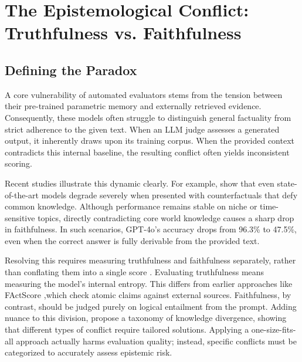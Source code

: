 \section{The Epistemological Conflict: Truthfulness vs. Faithfulness}
\label{sec:conflict}


\subsection{Defining the Paradox}

A core vulnerability of automated evaluators stems from the tension between their pre-trained parametric memory and externally retrieved evidence. Consequently, these models often struggle to distinguish general factuality from strict adherence to the given text. When an LLM judge assesses a generated output, it inherently draws upon its training corpus. When the provided context contradicts this internal baseline, the resulting conflict often yields inconsistent scoring.

Recent studies illustrate this dynamic clearly. For example, \citet{ming2025faithevallanguagemodelstay} show that even state-of-the-art models degrade severely when presented with counterfactuals that defy common knowledge. Although performance remains stable on niche or time-sensitive topics, directly contradicting core world knowledge causes a sharp drop in faithfulness. In such scenarios, GPT-4o's accuracy drops from 96.3\% to 47.5\%, even when the correct answer is fully derivable from the provided text.

Resolving this requires measuring truthfulness and faithfulness separately, rather than conflating them into a single score \citep{fadeeva2026faithfulnessawareuncertaintyquantificationfactchecking}. Evaluating truthfulness means measuring the model's internal entropy. This differs from earlier approaches like FActScore \citep{min2023factscorefinegrainedatomicevaluation} ,which check atomic claims against external sources. Faithfulness, by contrast, should be judged purely on logical entailment from the prompt. Adding nuance to this division, \citet{cattan2025draggedconflictsdetectingaddressing} propose a taxonomy of knowledge divergence, showing that different types of conflict require tailored solutions. Applying a one-size-fits-all approach actually harms evaluation quality; instead, specific conflicts must be categorized to accurately assess epistemic risk.

